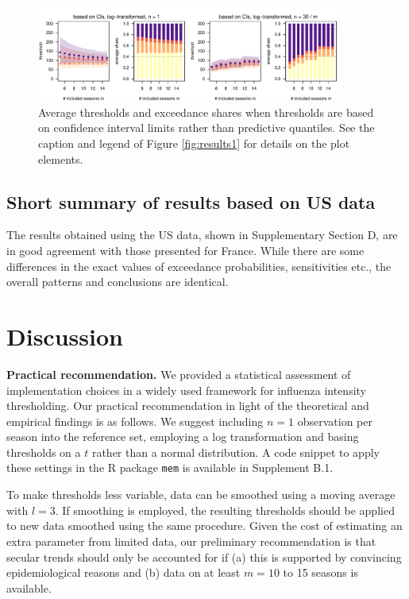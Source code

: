 \documentclass[12pt]{article}
\begin{document}
\begin{figure}[h!]
\begin{center}
\includegraphics[width=0.9\textwidth]{figure/plot_ci_fr.pdf}\vspace{-5mm}
\end{center}
\caption{Average thresholds and exceedance shares when thresholds are based on confidence interval limits rather than predictive quantiles. See the caption and legend of Figure \ref{fig:results1} for details on the plot elements.}
\label{fig:cis}
\end{figure}




\subsection{Short summary of results based on US data}
\label{subsec:results_us}

The results obtained using the US data, shown in Supplementary Section D, are in good agreement with those presented for France. While there are some differences in the exact values of exceedance probabilities, sensitivities etc., the overall patterns and conclusions are identical.

\section{Discussion}
\label{sec:discussion}

\textbf{Practical recommendation.} We provided a statistical assessment of implementation choices in a widely used framework for influenza intensity thresholding. Our practical recommendation in light of the theoretical and empirical findings is as follows. We suggest including $n = 1$ observation per season into the reference set, employing a log transformation and basing thresholds on a $t$ rather than a normal distribution. A code snippet to apply these settings in the R package \texttt{mem} is available in Supplement B.1.

To make thresholds less variable, data can be smoothed using a moving average with $l = 3$. If smoothing is employed, the resulting thresholds should be applied to new data smoothed using the same procedure. Given the cost of estimating an extra parameter from limited data, our preliminary recommendation is that secular trends should only be accounted for if (a) this is supported by convincing epidemiological reasons and (b) data on at least $m = 10$ to 15 seasons is available.
\end{document}
